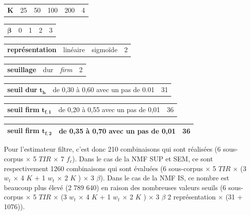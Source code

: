 \begin{table}[h]
\begin{tabularx}{17.5cm}{L{3cm}@{}C{3cm}@{}@{}C{3cm}@{}@{}C{3cm}@{}@{}C{3cm}@{}C{2cm}@{}}
    $\mathbf{K}$ & 25 & 50 & 100 & 200 & 4\\
\end{tabularx}

\begin{tabularx}{17.5cm}{L{3cm}@{}C{4cm}@{}@{}C{4cm}@{}@{}C{4cm}@{}C{2cm}@{}}
   $\mathbf{\beta}$ & 0 & 1 & 2 & 3\\
\end{tabularx}

\begin{tabularx}{17.5cm}{L{3cm}@{}C{6cm}@{}@{}C{6cm}@{}C{2cm}@{}}
   \textbf{représentation} & linéaire & sigmoïde & 2\\
\end{tabularx}

\begin{tabularx}{17.5cm}{L{3cm}@{}C{6cm}@{}@{}C{6cm}@{}C{2cm}@{}}
   \textbf{seuillage} & dur & \textit{firm} & 2\\
\end{tabularx}

\begin{tabularx}{17.5cm}{L{3cm}@{}C{12cm}@{}C{2cm}@{}}
	\textbf{seuil dur} $\mathbf{t_h}$ & de 0,30 à 0,60 avec un pas de 0.01 & 31\\
\end{tabularx}

\begin{tabularx}{17.5cm}{L{3cm}@{}C{12cm}@{}C{2cm}@{}}
   \textbf{seuil firm} $\mathbf{t_{f,1}}$ & de 0,20 à 0,55 avec un pas de 0,01 & 36\\
\end{tabularx}

\begin{tabularx}{17.5cm}{L{3cm}@{}C{12cm}@{}C{2cm}@{}}
   \textbf{seuil firm} $\mathbf{t_{f,2}}$ & de 0,35 à 0,70 avec un pas de 0,01 & 36\\
   \bottomrule
\end{tabularx}
\label{tab:experimental_factorsNMF_ambiance}
\end{table}

Pour l'estimateur filtre, c'est donc 210 combinaisons qui sont réalisées (6 sous-corpus $\times$ 5 $TIR$ $\times$ 7 $f_c$). Dans le cas de la NMF SUP et SEM, ce sont respectivement 1260 combinaisons qui sont évaluées (6 sous-corpus $\times$ 5 $TIR$ $\times$ (3 $w_t$ $\times$ 4 $K$ + 1 $w_t$ $\times$ 2 $K$ ) $\times$ 3 $\beta$). Dans le cas de la NMF IS, ce nombre est beaucoup plus élevé (2 789 640) en raison des nombreuses valeurs seuils (6 sous-corpus $\times$ 5 $TIR$ $\times$ (3 $w_t$ $\times$ 4 $K$ + 1 $w_t$ $\times$ 2 $K$ ) $\times$ 3 $\beta$ 2 représentation $\times$ (31 + 1076)).

